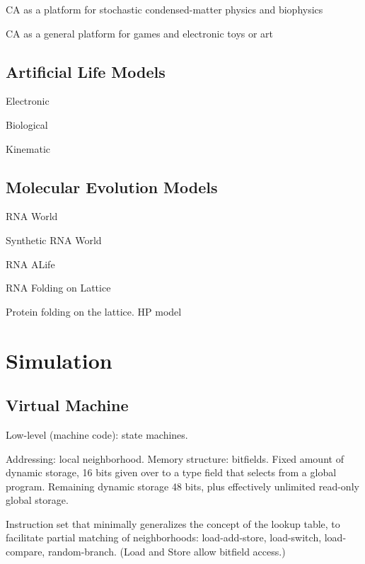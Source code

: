 \documentclass{acm_proc_article-sp}
\begin{document}
CA as a platform for stochastic condensed-matter physics and biophysics
\cite{Schiff2007}

CA as a general platform for games
\cite{SimCity,DwarfFortress,Minecraft}
and electronic toys or art \cite{RuckerCAPOW,PowderToy}

\subsection{Artificial Life Models}

Electronic
\cite{VonNeumannBook,Wireworld}

Biological
\cite{ConwaysLife,Langton1986}

Kinematic
\cite{Stevens2011}

\subsection{Molecular Evolution Models}

RNA World
\cite{Woese1967}

Synthetic RNA World
\cite{PaulJoyce2002}

RNA ALife
\cite{journals/alife/Schuster94}

RNA Folding on Lattice
\cite{LeoniVanderzande2003,JostEveraers2010,ZaraPretti2007,GillespieMayneJiang2009}

Protein folding on the lattice. HP model \cite{Dill1985,PandeRokhsar1999}

\section{Simulation}

\subsection{Virtual Machine}

Low-level (machine code):
state machines.

Addressing: local neighborhood.
Memory structure: bitfields. Fixed amount of dynamic storage, 16 bits given over to a type field that selects from a global program.
Remaining dynamic storage 48 bits, plus effectively unlimited read-only global storage.

Instruction set that minimally generalizes the concept of the lookup table, to facilitate partial matching of neighborhoods:
load-add-store, load-switch, load-compare, random-branch.
(Load and Store allow bitfield access.)
\end{document}
